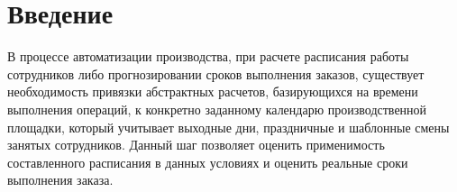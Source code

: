 \section{Введение}
В процессе автоматизации производства, при расчете расписания работы сотрудников либо прогнозировании сроков выполнения заказов, существует необходимость привязки абстрактных расчетов, базирующихся на времени выполнения операций, к конкретно заданному календарю производственной площадки, который учитывает выходные дни, праздничные и шаблонные смены занятых сотрудников. Данный шаг позволяет оценить применимость составленного расписания в данных условиях и оценить реальные сроки выполнения заказа.
\newpage